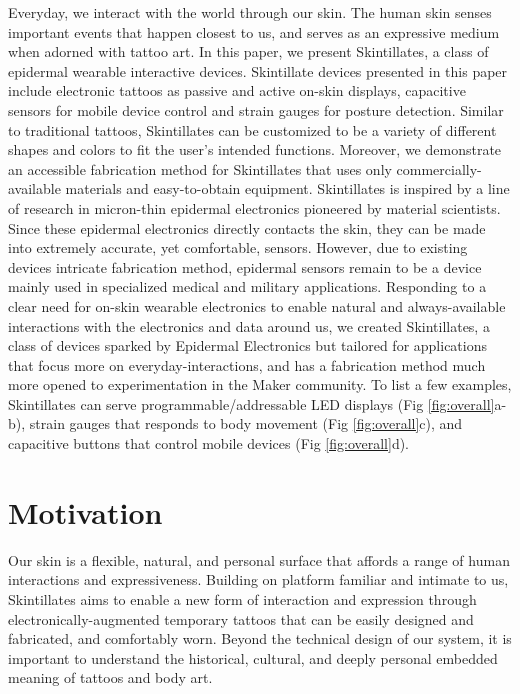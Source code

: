 \documentclass{sigchi}
\begin{document}
Everyday, we interact with the world through our skin. The human skin senses important events that happen closest to us, and serves as an expressive medium when adorned with tattoo art. In this paper, we present Skintillates, a class of epidermal wearable interactive devices. Skintillate devices presented in this paper include electronic tattoos as passive and active on-skin displays, capacitive sensors for mobile device control and strain gauges for posture detection. Similar to traditional tattoos, Skintillates can be customized to be a variety of different shapes and colors to fit the user’s intended functions. Moreover, we demonstrate an accessible fabrication  method  for Skintillates that  uses  only  commercially-available materials and easy-to-obtain equipment. Skintillates is inspired by a line of research in micron-thin epidermal electronics pioneered by material scientists. Since these epidermal electronics directly contacts the skin, they can be made into extremely accurate, yet comfortable, sensors. However, due to existing devices intricate fabrication method, epidermal sensors remain to be a device mainly used in specialized medical and military applications. Responding to a clear need for on-skin wearable electronics to enable natural and always-available interactions   with   the    electronics    and    data    around us\cite{MunehikoSato:2012we,chris:2011ve,ChrisHarrison:2010vi,DavidKim:2012uu,Harrison:2014ft,Laput:2014du}, we created Skintillates, a class of devices sparked by Epidermal Electronics but tailored for applications that focus more on everyday-interactions, and has a fabrication method much more opened to experimentation in the Maker community. To list a few examples, Skintillates can serve programmable/addressable LED displays (Fig \ref{fig:overall}a-b), strain gauges that responds to body movement (Fig \ref{fig:overall}c), and capacitive buttons that control mobile devices (Fig \ref{fig:overall}d).

\section{Motivation}
Our skin is a flexible, natural, and personal surface that affords a range of human interactions and expressiveness.  Building on platform familiar and intimate to us, Skintillates aims to enable a new form of interaction and expression through electronically-augmented temporary tattoos that can be easily designed and fabricated, and comfortably worn.  Beyond the technical design of our system, it is important to understand the historical, cultural, and deeply personal embedded meaning of tattoos and body art. 
\end{document}
